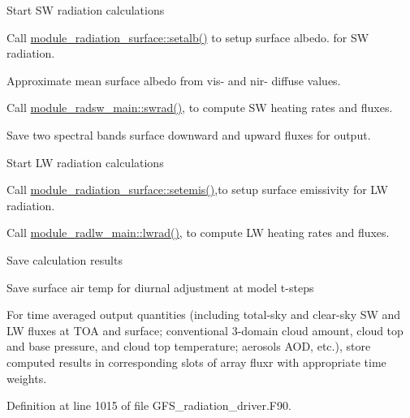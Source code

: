 \begin{DoxyEnumerate}
\begin{DoxyItemize}
\end{DoxyItemize}
\item Start SW radiation calculations
\begin{DoxyItemize}
\item Call \hyperlink{group__module__radiation__surface_ga3e3bd6550a924c538c88169c7c169a5b}{module\+\_\+radiation\+\_\+surface\+::setalb()} to setup surface albedo. for SW radiation.
\end{DoxyItemize}
\item Approximate mean surface albedo from vis-\/ and nir-\/ diffuse values.
\begin{DoxyItemize}
\item Call \hyperlink{group__module__radsw__main_ga784397878835a8cdd0b14a7b9eafb4e3}{module\+\_\+radsw\+\_\+main\+::swrad()}, to compute SW heating rates and fluxes.
\item Save two spectral bands\textquotesingle{} surface downward and upward fluxes for output.
\end{DoxyItemize}
\item Start LW radiation calculations
\begin{DoxyItemize}
\item Call \hyperlink{group__module__radiation__surface_ga57ea2aa09c4194e14f2c538ef7fad7b3}{module\+\_\+radiation\+\_\+surface\+::setemis()},to setup surface emissivity for LW radiation.
\item Call \hyperlink{group__module__radlw__main_gaf20db29eaadab298ccd8b6bf489a53f4}{module\+\_\+radlw\+\_\+main\+::lwrad()}, to compute LW heating rates and fluxes.
\end{DoxyItemize}
\item Save calculation results
\begin{DoxyItemize}
\item Save surface air temp for diurnal adjustment at model t-\/steps
\item For time averaged output quantities (including total-\/sky and clear-\/sky SW and LW fluxes at T\+OA and surface; conventional 3-\/domain cloud amount, cloud top and base pressure, and cloud top temperature; aerosols A\+OD, etc.), store computed results in corresponding slots of array fluxr with appropriate time weights. 
\end{DoxyItemize}
\end{DoxyEnumerate}

Definition at line 1015 of file G\+F\+S\+\_\+radiation\+\_\+driver.\+F90.



